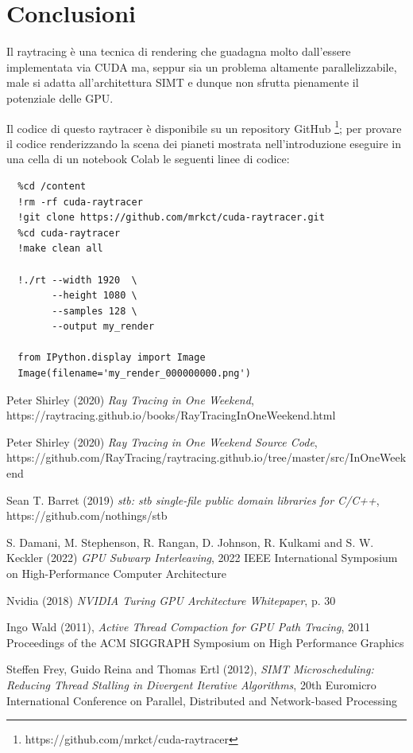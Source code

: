 \documentclass[12pt, twoside]{article}
\begin{document}
\section{Conclusioni}
Il raytracing è una tecnica di rendering che guadagna molto dall'essere
implementata via CUDA ma, seppur sia un problema altamente parallelizzabile,
male si adatta all'architettura SIMT e dunque non sfrutta pienamente il
potenziale delle GPU.

Il codice di questo raytracer è disponibile su un repository GitHub
\footnote{https://github.com/mrkct/cuda-raytracer};
per provare il codice renderizzando la scena dei pianeti mostrata
nell'introduzione eseguire in una cella di un notebook Colab
le seguenti linee di codice:

\begin{lstlisting}
  %cd /content
  !rm -rf cuda-raytracer
  !git clone https://github.com/mrkct/cuda-raytracer.git
  %cd cuda-raytracer
  !make clean all

  !./rt --width 1920  \
        --height 1080 \
        --samples 128 \
        --output my_render

  from IPython.display import Image
  Image(filename='my_render_000000000.png')
\end{lstlisting}

\newpage
\begin{thebibliography}{9}
    Peter Shirley (2020) \emph{Ray Tracing in One Weekend}, https://raytracing.github.io/books/RayTracingInOneWeekend.html

    Peter Shirley (2020) \emph{Ray Tracing in One Weekend Source Code}, https://github.com/RayTracing/raytracing.github.io/tree/master/src/InOneWeekend

    \bibitem{stb}
    Sean T. Barret (2019) \emph{stb: stb single-file public domain libraries for C/C++}, https://github.com/nothings/stb

    S. Damani, M. Stephenson, R. Rangan, D. Johnson, R. Kulkami and S. W. Keckler (2022) \emph{GPU Subwarp Interleaving}, 
    2022 IEEE International Symposium on High-Performance Computer Architecture

    \bibitem{2018rtcores}
    Nvidia (2018) \emph{NVIDIA Turing GPU Architecture Whitepaper}, p. 30

    Ingo Wald (2011), \emph{Active Thread Compaction for GPU Path Tracing}, 2011 Proceedings of the ACM SIGGRAPH Symposium on High Performance Graphics

    Steffen Frey, Guido Reina and Thomas Ertl (2012), \emph{SIMT Microscheduling: Reducing Thread Stalling in Divergent Iterative Algorithms}, 20th Euromicro International Conference on Parallel, Distributed and Network-based Processing
\end{thebibliography}
\end{document}
